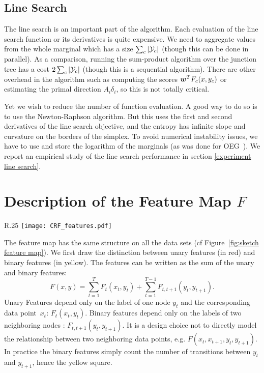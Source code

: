 \begin{subappendices}
	\subsection{Line Search} \label{app:sec:implementation line search}
	The line search is an important part of the algorithm.
	Each evaluation of the line search function or its derivatives is quite expensive.
	We need to aggregate values from the whole marginal which has a size $\sum_c | {\mathcal Y}_c |$ (though this can be done in parallel).
	As a comparison, running the sum-product algorithm over the junction tree has a cost $2\sum_c | {\mathcal Y}_c |$ (though this is a sequential algorithm).
	There are other overhead in the algorithm such as computing the scores $\boldsymbol{w}^T F_c(x, y_c)$ or estimating the primal direction $A_i \delta_i$, so this is not totally critical.

	Yet we wish to reduce the number of function evaluation.
	A good way to do so is to use the Newton-Raphson algorithm.
	But this uses the first and second derivatives of the line search objective, and the entropy has infinite slope and curvature on the borders of the simplex.
	To avoid numerical instability issues, we have to use and store the logarithm of the marginals (as was done for OEG~\citep{collins2008exponentiated}).
	We report an empirical study of the line search performance in section \ref{experiment line search}.

	\section{Description of the Feature Map $F$}
	\label{app:feature}
	\begin{wrapfigure}[20]{R}{.25\textwidth}
		\centering
		\texttt{[image: CRF\_features.pdf]}
		\caption[Sketch of sequence feature maps]{Sketch of the feature map. K is the number of different labels for one node. A is the number of attributes.}
		\label{fig:sketch feature map}
	\end{wrapfigure}

	The feature map has the same structure on all the data sets (cf Figure~\ref{fig:sketch feature map}).
	We first draw the distinction between unary features (in red) and binary features (in yellow). The features can be written as the sum of the unary and binary features:
	\begin{equation*}
		F(x, y) = \sum_{t=1}^T F_t(x_t, y_t) +  \sum_{t=1}^{T-1} F_{t, t+1}(y_t, y_{t+1}).
	\end{equation*}
	Unary Features depend only on the label of one node $y_t$ and the corresponding data point~$x_t$: $F_t(x_t, y_t)$.
	Binary features depend only on the labels of two neighboring nodes : $F_{t, t+1}(y_t, y_{t+1})$.
	It is a design choice not to directly model the relationship between two neighboring data points, e.g. $F(x_t, x_{t+1}, y_t, y_{t+1})$.
	In practice the binary features simply count the number of transitions between $y_t$ and $y_{t+1}$, hence the yellow square.


\end{subappendices}
